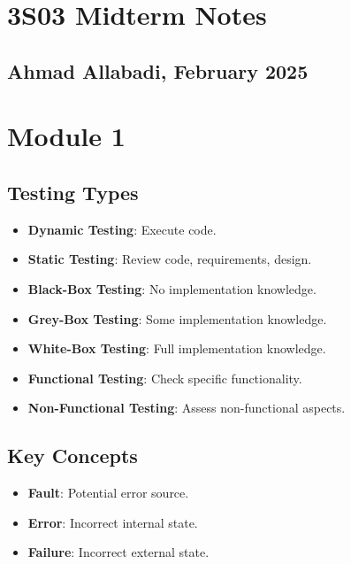 \documentclass[10pt,portrait]{article}
\begin{document}
\small

\begin{multicols}{ 2 }
\section*{3S03 Midterm Notes}
\subsection*{Ahmad Allabadi, February 2025}

\section*{Module 1}

\subsection*{Testing Types}
\begin{itemize}
    \item \textbf{Dynamic Testing}: Execute code.
    \item \textbf{Static Testing}: Review code, requirements, design.
    \item \textbf{Black-Box Testing}: No implementation knowledge.
    \item \textbf{Grey-Box Testing}: Some implementation knowledge.
    \item \textbf{White-Box Testing}: Full implementation knowledge.
    \item \textbf{Functional Testing}: Check specific functionality.
    \item \textbf{Non-Functional Testing}: Assess non-functional aspects.
\end{itemize}

\subsection*{Key Concepts}
\begin{itemize}
    \item \textbf{Fault}: Potential error source.
    \item \textbf{Error}: Incorrect internal state.
    \item \textbf{Failure}: Incorrect external state.
\end{itemize}


\end{multicols}
\end{document}
